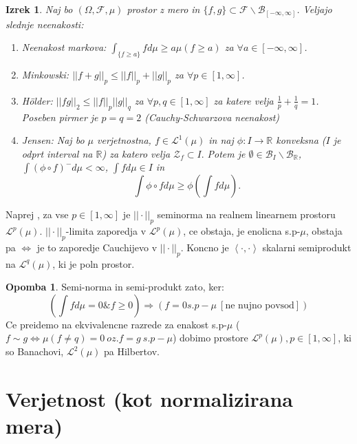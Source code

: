 \documentclass[a4paper,12pt]{article}
\theoremstyle{definition} %
\newtheorem{opomba}[definicija]{Opomba}
\theoremstyle{plain} %
\newtheorem{izrek}[definicija]{Izrek}
\newcommand{\R}{\mathbb{R}}
\newcommand{\F}{\mathcal{F}}
\newcommand{\B}{\mathcal{B}}
\newcommand{\Le}{\mathcal{L}}
\begin{document}
            \begin{izrek}
                Naj bo $(\Omega, \F, \mu)$ prostor z mero in $\{f, g\} \subset \F\backslash\mathcal{B}_{[-\infty, \infty]}$. Veljajo slednje neenakosti:
                \begin{enumerate}
                    \item Neenakost markova: $\int_{\{f \geq a\}}fd\mu \geq a\mu(f\geq a)$ za $\forall a \in [-\infty, \infty]$.
                    \item Minkowski: $ || f + g||_p \leq ||f||_p + ||g||_p$ za $\forall p \in [1, \infty]$.
                    \item Hölder: $||fg||_2 \leq ||f||_p||g||_q$ za $\forall p, q \in [1, \infty]$ za katere velja $\frac{1}{p} + \frac{1}{q} = 1$. \\
                    Poseben pirmer je $p = q = 2$ (Cauchy-Schwarzova neenakost)
                    \item Jensen: Naj bo $\mu$ verjetnostna, $f\in\Le^1(\mu)$ in naj $\phi: I \rightarrow \R$ konveksna ($I$ je odprt interval na $\R$) za katero velja $\mathcal{Z}_f \subset I.$ Potem je $\emptyset \in \B_I\backslash\B_\R$, $\int(\phi\circ f)^-d\mu < \infty$, $\int fd\mu \in I$ in 
                    $$
                        \int \phi\circ fd\mu \geq \phi\left(\int fd\mu\right).
                    $$
                \end{enumerate}
            \end{izrek}
            Naprej , za vse $p\in[1, \infty]$ je $||\cdot||_p$ seminorma na realnem linearnem prostoru $\Le^p(\mu)$. $||\cdot||_p$-limita zaporedja v $\Le^p(\mu)$, ce obstaja, je enolicna s.p-$\mu$, obstaja pa $\iff$ je to zaporedje Cauchijevo v $||\cdot||_p.$ Koncno je $\left<\cdot, \cdot\right>$ skalarni semiprodukt na $\Le^q(\mu)$, ki je poln prostor.
            \begin{opomba}
                Semi-norma in semi-produkt zato, ker:
                $$
                    \left(\int fd\mu = 0 \& f \geq 0\right) \Rightarrow \left(f = 0 s.p-\mu \ [\text{ne nujno povsod}]\right)
                $$
                Ce preidemo na ekvivalencne razrede za enakost s.p-$\mu$ ($f\sim g \iff \mu(f\neq q) = 0 \ oz. f=g \ s.p-\mu$) dobimo prostore $\Le^p(\mu), p\in[1, \infty]$, ki so Banachovi, 
                $\Le^2(\mu)$ pa Hilbertov.
            \end{opomba}

\section{Verjetnost (kot normalizirana mera)}  
\end{document}
